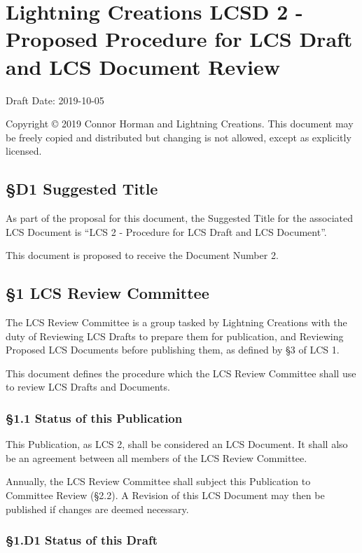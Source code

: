 \section{Lightning Creations LCSD 2 - Proposed Procedure for LCS Draft
and LCS Document
Review}\label{lightning-creations-lcsd-2---proposed-procedure-for-lcs-draft-and-lcs-document-review}

Draft Date: 2019-10-05

Copyright © 2019 Connor Horman and Lightning Creations. This document
may be freely copied and distributed but changing is not allowed, except
as explicitly licensed.

\subsection{§D1 Suggested Title}\label{d1-suggested-title}

As part of the proposal for this document, the Suggested Title for the
associated LCS Document is ``LCS 2 - Procedure for LCS Draft and LCS
Document''.

This document is proposed to receive the Document Number 2.

\subsection{§1 LCS Review Committee}\label{lcs-review-committee}

The LCS Review Committee is a group tasked by Lightning Creations with
the duty of Reviewing LCS Drafts to prepare them for publication, and
Reviewing Proposed LCS Documents before publishing them, as defined by
§3 of LCS 1.

This document defines the procedure which the LCS Review Committee shall
use to review LCS Drafts and Documents.

\subsubsection{§1.1 Status of this
Publication}\label{status-of-this-publication}

This Publication, as LCS 2, shall be considered an LCS Document. It
shall also be an agreement between all members of the LCS Review
Committee.

Annually, the LCS Review Committee shall subject this Publication to
Committee Review (§2.2). A Revision of this LCS Document may then be
published if changes are deemed necessary.

\subsubsection{§1.D1 Status of this
Draft}\label{d1-status-of-this-draft}

